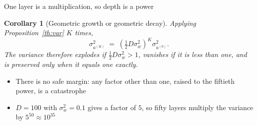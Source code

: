 \documentclass[aspectratio=169, 11pt]{beamer}
\newtheorem{corx}[theorem]{Corollary}
\newcommand{\figcap}[2][0.90]{%
  \begin{center}\begin{minipage}{#1\textwidth}\centering
    {\scriptsize\color{mcMuted} #2}
  \end{minipage}\end{center}}
\newcommand{\src}[3]{}      %
\begin{document}
\begin{frame}{One layer is a multiplication, so depth is a power}
  \src{he2015}{equation}{9}
  \src{he2015}{section}{2.2}
  \src{prince2023}{section}{7.5}
  \vspace{-0.25em}
  \begin{corx}[Geometric growth or geometric decay]\label{th:geom}
    \small
    Applying Proposition~\ref{th:var} $K$ times,
    \[
      \sigma^2_{a^{(K)}} \;=\;
        \left(\tfrac12 D \sigma_w^2\right)^{K} \sigma^2_{a^{(0)}} .
    \]
    The variance therefore explodes if
    $\tfrac12 D \sigma_w^2 > 1$, vanishes if it is less than one, and is
    preserved only when it equals one exactly.
  \end{corx}
  \vspace{0.25em}
  \begin{itemize}\itemsep0.3em
    \item There is no safe margin: any factor other than one, raised to
          the fiftieth power, is a catastrophe
    \item $D = 100$ with $\sigma_w^2 = 0.1$ gives a factor of $5$, so
          fifty layers multiply the variance by $5^{50} \approx 10^{35}$
  \end{itemize}
\end{frame}

\end{document}
